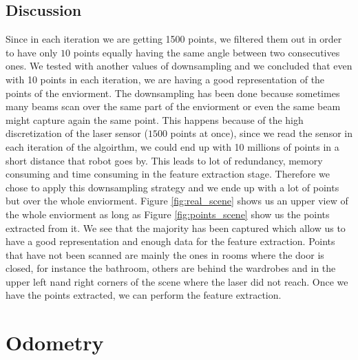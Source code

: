 \documentclass[twoside,conference,a4paper]{IEEEtran}
\begin{document}
\subsection{Discussion}
Since in each iteration we are getting 1500 points, we filtered them out in order to have only $ 10 $ points equally 
having the same angle between two consecutives ones. We tested with another values of downsampling and we concluded that 
even with 10 points in each iteration, we are having a good representation of the points of the enviorment. The 
downsampling has been done because sometimes many beams scan over the same part of the enviorment or even the same beam
might capture again the same point. This happens because of the high discretization of the laser sensor ($ 1500 $ points
at once), since we read the sensor in each iteration of the algoirthm, we could end up with 10 millions of points in a
short distance that robot goes by. This leads to lot of redundancy, memory consuming and time consuming in the feature
extraction stage. Therefore we chose to apply this downsampling strategy and we ende up with a lot of points but over the whole
enviorment. Figure \ref{fig:real_scene} shows us an upper view of the whole enviorment as long as Figure 
\ref{fig:points_scene} show us the points extracted from it. We see that the majority has been captured which allow us
to have a good representation and enough data for the feature extraction. Points that have not been scanned are mainly
the ones in rooms where the door is closed, for instance the bathroom, others are behind the wardrobes and in the upper
left nand right corners of the scene where the laser did not reach. Once we have the points extracted, we can perform the feature extraction.    

\section{Odometry}
\end{document}
